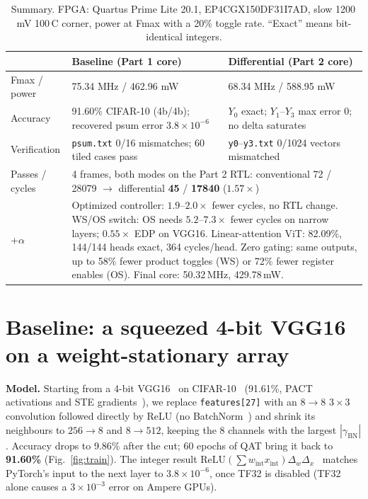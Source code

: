 \documentclass{article}
\newcommand{\code}[1]{\texttt{#1}}
\newcommand{\sld}[1]{\unskip~\cite[#1]{ece284slides}}
\begin{document}
\begin{table}[!htb]
\centering
\caption{Summary. FPGA: Quartus Prime Lite 20.1, EP4CGX150DF31I7AD, slow 1200\,mV 100\,\textdegree C corner, power at Fmax
with a 20\% toggle rate. ``Exact'' means bit-identical integers.}
\label{tab:summary}
\small
\begin{tabular}{@{}p{1.9cm}p{5.5cm}p{5.5cm}@{}}
\toprule
 & \textbf{Baseline (Part 1 core)} & \textbf{Differential (Part 2 core)} \\
\midrule
Fmax / power & 75.34 MHz / 462.96 mW & 68.34 MHz / 588.95 mW \\
Accuracy & 91.60\% CIFAR-10 (4b/4b); recovered psum error $3.8\times10^{-6}$ &
  $Y_0$ exact; $Y_1$--$Y_3$ max error 0; no delta saturates \\
Verification & \code{psum.txt} 0/16 mismatches; 60 tiled cases pass &
  \code{y0}--\code{y3.txt} 0/1024 vectors mismatched \\
Passes / cycles & \multicolumn{2}{p{11.2cm}}{4 frames, both modes on the Part 2 RTL: conventional 72 / \num{28079} $\to$
differential \textbf{45} / \textbf{\num{17840}} ($1.57\times$)} \\
\midrule
+$\alpha$ & \multicolumn{2}{p{11.2cm}}{Optimized controller: $1.9$--$2.0\times$ fewer cycles, no RTL change.
WS/OS switch: OS needs $5.2$--$7.3\times$ fewer cycles on narrow layers; $0.55\times$ EDP on VGG16.
Linear-attention ViT: 82.09\%, 144/144 heads exact, 364 cycles/head. Zero gating: same outputs, up to 58\% fewer product
toggles (WS) or 72\% fewer register enables (OS). Final core: 50.32\,MHz, 429.78\,mW.} \\
\bottomrule
\end{tabular}
\end{table}

\section{Baseline: a squeezed 4-bit VGG16 on a weight-stationary array}
\label{sec:part1}
\textbf{Model.} Starting from a 4-bit VGG16~\cite{simonyan2015vgg} on CIFAR-10\sld{Ch4:p17} (91.61\%, PACT activations and STE
gradients\sld{Ch6:p6--7, Ch7:p6--7}), we replace \code{features[27]} with an $8{\to}8$ $3{\times}3$ convolution followed
directly by ReLU (no BatchNorm\sld{Ch4:p13}) and shrink its
neighbours to $256{\to}8$ and $8{\to}512$, keeping the 8 channels with the largest $|\gamma_\text{BN}|$. Accuracy drops to
9.86\% after the cut; 60 epochs of QAT bring it back to \textbf{91.60\%} (Fig.~\ref{fig:train}). The integer result
$\text{ReLU}(\sum w_\text{int}x_\text{int})\Delta_w\Delta_x$\sld{Ch6:p8} matches PyTorch's input to the next layer to $3.8\times10^{-6}$, once TF32
is disabled (TF32 alone causes a $3\times10^{-3}$ error on Ampere GPUs).
\end{document}
